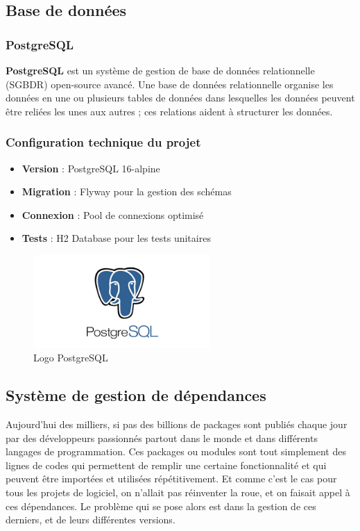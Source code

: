 \documentclass[12pt,a4paper]{report}
\begin{document}
\subsection{Base de données}

\subsubsection{PostgreSQL}

\textbf{PostgreSQL} est un système de gestion de base de données relationnelle (SGBDR) open-source avancé. Une base de données relationnelle organise les données en une ou plusieurs tables de données dans lesquelles les données peuvent être reliées les unes aux autres ; ces relations aident à structurer les données.

\subsubsection{Configuration technique du projet}

\begin{itemize}
\item \textbf{Version} : PostgreSQL 16-alpine
\item \textbf{Migration} : Flyway pour la gestion des schémas
\item \textbf{Connexion} : Pool de connexions optimisé
\item \textbf{Tests} : H2 Database pour les tests unitaires
\end{itemize}

\begin{figure}[H]
\centering
\includegraphics[width=0.6\textwidth]{latex_media/media/image26.png}
\caption{Logo PostgreSQL}
\label{fig:logo-postgresql}
\end{figure}

\subsection{Système de gestion de dépendances}

Aujourd'hui des milliers, si pas des billions de packages sont publiés chaque jour par des développeurs passionnés partout dans le monde et dans différents langages de programmation. Ces packages ou modules sont tout simplement des lignes de codes qui permettent de remplir une certaine fonctionnalité et qui peuvent être importées et utilisées répétitivement. Et comme c'est le cas pour tous les projets de logiciel, on n'allait pas réinventer la roue, et on faisait appel à ces dépendances. Le problème qui se pose alors est dans la gestion de ces derniers, et de leurs différentes versions.
\end{document}
